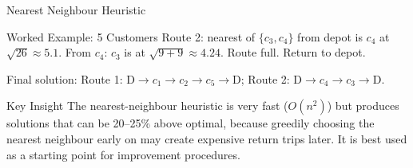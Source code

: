\documentclass[aspectratio=169,10pt]{beamer}
\begin{document}
\begin{frame}[allowframebreaks]{Nearest Neighbour Heuristic}
\begin{exampleblock}{Worked Example: 5 Customers}
    \medskip
    Route 2: nearest of $\{c_3,c_4\}$ from depot is $c_4$ at
    $\sqrt{26}\approx 5.1$.  From $c_4$: $c_3$ is at
    $\sqrt{9+9}\approx 4.24$.  Route full.  Return to depot.

    \medskip
    Final solution: Route 1: D$\to c_1 \to c_2 \to c_5\to$D;
    Route 2: D$\to c_4\to c_3\to$D.
  \end{exampleblock}

  \begin{alertblock}{Key Insight}
    The nearest-neighbour heuristic is very fast ($O(n^2)$) but produces
    solutions that can be 20--25\% above optimal, because greedily
    choosing the nearest neighbour early on may create expensive
    return trips later.  It is best used as a starting point for
    improvement procedures.
  \end{alertblock}

\end{frame}
\end{document}
